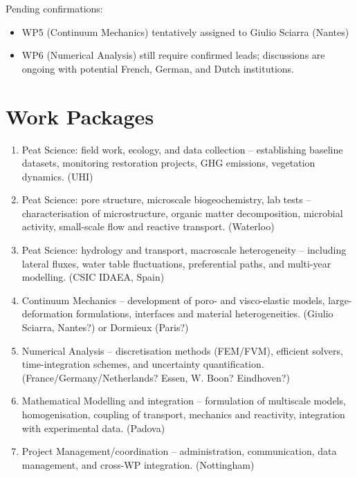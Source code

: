 \documentclass[12pt]{article}
\begin{document}
Pending confirmations:
\begin{itemize}
    \item WP5 (Continuum Mechanics) tentatively assigned to Giulio Sciarra (Nantes)
    \item WP6 (Numerical Analysis) still require confirmed leads; discussions are ongoing with potential French, German, and Dutch institutions.
\end{itemize}


\section{Work Packages}

\begin{enumerate}
    \item Peat Science: field work, ecology, and data collection – establishing baseline datasets, monitoring restoration projects, GHG emissions, vegetation dynamics. (UHI)
    \item Peat Science: pore structure, microscale biogeochemistry, lab tests – characterisation of microstructure, organic matter decomposition, microbial activity, small-scale flow and reactive transport. (Waterloo)
    \item Peat Science: hydrology and transport, macroscale heterogeneity – including lateral fluxes, water table fluctuations, preferential paths, and multi-year modelling. (CSIC IDAEA, Spain)
    \item Continuum Mechanics – development of poro- and visco-elastic models, large-deformation formulations, interfaces and material heterogeneities. (Giulio Sciarra, Nantes?) or Dormieux (Paris?)
    \item Numerical Analysis – discretisation methods (FEM/FVM), efficient solvers, time-integration schemes, and uncertainty quantification. (France/Germany/Netherlands? Essen, W. Boon? Eindhoven?)
        \item Mathematical Modelling and integration – formulation of multiscale models, homogenisation, coupling of transport, mechanics and reactivity, integration with experimental data. (Padova)

    \item Project Management/coordination – administration, communication, data management, and cross-WP integration. (Nottingham)
\end{enumerate}
\end{document}

